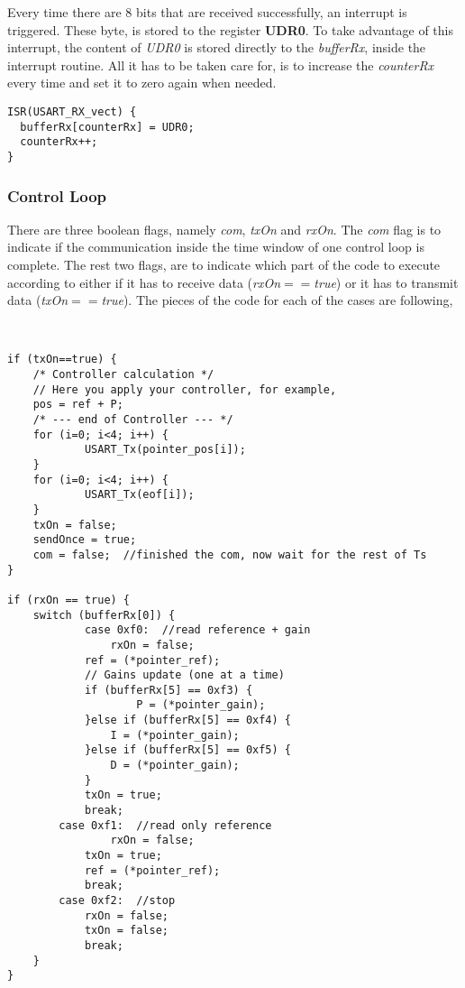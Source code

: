 \noindent Every time there are 8 bits that are received successfully, an interrupt is triggered. These byte, is stored to the register \textbf{UDR0}. To take advantage of this interrupt, the content of \textit{UDR0} is stored directly to the \textit{bufferRx}, inside the interrupt routine. All it has to be taken care for, is to increase the \textit{counterRx} every time and set it to zero again when needed.

\begin{lstlisting}[style=My_Arduino, caption=Incoming data interrupt routine,
	label=code:ard:USART rx]
ISR(USART_RX_vect) {
  bufferRx[counterRx] = UDR0;
  counterRx++;
}
\end{lstlisting}






\subsubsection{Control Loop}

There are three boolean flags, namely \textit{com}, \textit{txOn} and \textit{rxOn}. The \textit{com} flag is to indicate if the communication inside the time window of one control loop is complete. The rest two flags, are to indicate which part of the code to execute according to either if it has to receive data (\textit{rxOn$==$true}) or it has to transmit data (\textit{txOn$==$true}). The pieces of the code for each of the cases are following,

\


\begin{lstlisting}[style=My_Arduino, caption=Read and Send data, label=code:ard:rx tx]
if (txOn==true) {     
	/* Controller calculation */
    // Here you apply your controller, for example,
    pos = ref + P;
    /* --- end of Controller --- */
    for (i=0; i<4; i++) {
    		USART_Tx(pointer_pos[i]);
    }
    for (i=0; i<4; i++) {
    		USART_Tx(eof[i]);
    }
    txOn = false;
    sendOnce = true;
    com = false;  //finished the com, now wait for the rest of Ts
}  
  
if (rxOn == true) {
	switch (bufferRx[0]) {
    		case 0xf0:  //read reference + gain
        		rxOn = false;
            ref = (*pointer_ref);
            // Gains update (one at a time)
           	if (bufferRx[5] == 0xf3) {
            		P = (*pointer_gain);
           	}else if (bufferRx[5] == 0xf4) {
               	I = (*pointer_gain);
            }else if (bufferRx[5] == 0xf5) {
               	D = (*pointer_gain);
            }
            txOn = true;
            break;
      	case 0xf1:  //read only reference
        		rxOn = false;
            txOn = true;
            ref = (*pointer_ref);
            break;
       	case 0xf2:  //stop
           	rxOn = false;
           	txOn = false;
           	break;
	}
}
\end{lstlisting}